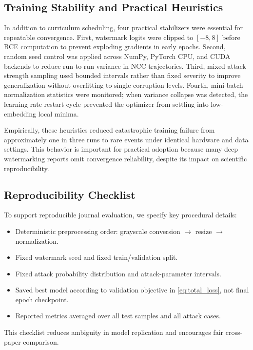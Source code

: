 \documentclass[journal]{IEEEtran}
\begin{document}
\subsection{Training Stability and Practical Heuristics}

In addition to curriculum scheduling, four practical stabilizers were essential
for repeatable convergence. First, watermark logits were clipped to
$[-8, 8]$ before BCE computation to prevent exploding gradients in early epochs.
Second, random seed control was applied across NumPy, PyTorch CPU, and CUDA
backends to reduce run-to-run variance in NCC trajectories. Third, mixed attack
strength sampling used bounded intervals rather than fixed severity to improve
generalization without overfitting to single corruption levels. Fourth,
mini-batch normalization statistics were monitored; when variance collapse was
detected, the learning rate restart cycle prevented the optimizer from settling
into low-embedding local minima.

Empirically, these heuristics reduced catastrophic training failure from
approximately one in three runs to rare events under identical hardware and
data settings. This behavior is important for practical adoption because many
deep watermarking reports omit convergence reliability, despite its impact on
scientific reproducibility.

\subsection{Reproducibility Checklist}

To support reproducible journal evaluation, we specify key procedural details:
\begin{itemize}
  \item Deterministic preprocessing order: grayscale conversion $\rightarrow$
  resize $\rightarrow$ normalization.
  \item Fixed watermark seed and fixed train/validation split.
  \item Fixed attack probability distribution and attack-parameter intervals.
  \item Saved best model according to validation objective in \eqref{eq:total_loss},
  not final epoch checkpoint.
  \item Reported metrics averaged over all test samples and all attack cases.
\end{itemize}

This checklist reduces ambiguity in model replication and encourages fair
cross-paper comparison.
\end{document}
